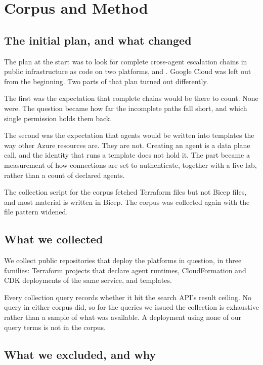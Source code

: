 \section{Corpus and Method}
\label{sec:methodology}

\subsection{The initial plan, and what changed}

The plan at the start was to look for complete cross-agent escalation chains
in public infrastructure as code on two platforms, \agentcore and \foundry.
Google Cloud was left out from the beginning. Two parts of that plan turned
out differently.

The first was the expectation that complete chains would be there to count.
None were. The question became how far the incomplete paths fall short, and
which single permission holds them back.

The second was the expectation that \foundry agents would be written into
templates the way other Azure resources are. They are not. Creating an agent
is a data plane call, and the identity that runs a template does not hold it.
The \foundry part became a measurement of how connections are set to
authenticate, together with a live lab, rather than a count of declared
agents.

The collection script for the \foundry corpus fetched Terraform files but not
Bicep files, and most \foundry material is written in Bicep. The corpus was
collected again with the file pattern widened.

\subsection{What we collected}

We collect public repositories that deploy the platforms in question, in three
families: Terraform projects that declare \agentcore agent runtimes,
CloudFormation and CDK deployments of the same service, and \foundry
templates.

Every collection query records whether it hit the search API's result ceiling.
No query in either corpus did, so for the queries we issued the collection is
exhaustive rather than a sample of what was available. A deployment using none
of our query terms is not in the corpus.

\subsection{What we excluded, and why}


